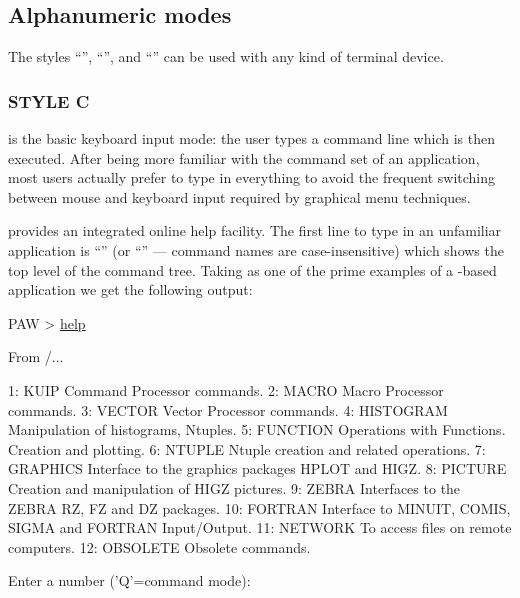 \subsection{Alphanumeric modes}

The styles ``'', ``'', and ``'' can be
used with any kind of terminal device.

\subsubsection{STYLE C}

 is the basic keyboard input mode:
the user types a command line which is then executed.
After being more familiar with the command set of an application, most
users actually prefer  to type in everything to avoid
the frequent switching between mouse and keyboard input required by
graphical menu techniques.

\KUIP{} provides an integrated online help facility.
The first line to type in an unfamiliar application is
``'' (or ``'' --- \KUIP{} command names are
case-insensitive) which shows the top level of the command tree.
Taking \PAW{} as one of the prime examples of a \KUIP{}-based
application we get the following output:
\begin{XMP}
PAW > \underline{help}

From  /...

 1:   KUIP          Command Processor commands.
 2:   MACRO         Macro Processor commands.
 3:   VECTOR        Vector Processor commands.
 4:   HISTOGRAM     Manipulation of histograms, Ntuples.
 5:   FUNCTION      Operations with Functions. Creation and plotting.
 6:   NTUPLE        Ntuple creation and related operations.
 7:   GRAPHICS      Interface to the graphics packages HPLOT and HIGZ.
 8:   PICTURE       Creation and manipulation of HIGZ pictures.
 9:   ZEBRA         Interfaces to the ZEBRA RZ, FZ and DZ packages.
10:   FORTRAN       Interface to MINUIT, COMIS, SIGMA and FORTRAN Input/Output.
11:   NETWORK       To access files on remote computers.
12:   OBSOLETE      Obsolete commands.

Enter a number ('Q'=command mode):
\end{XMP}

